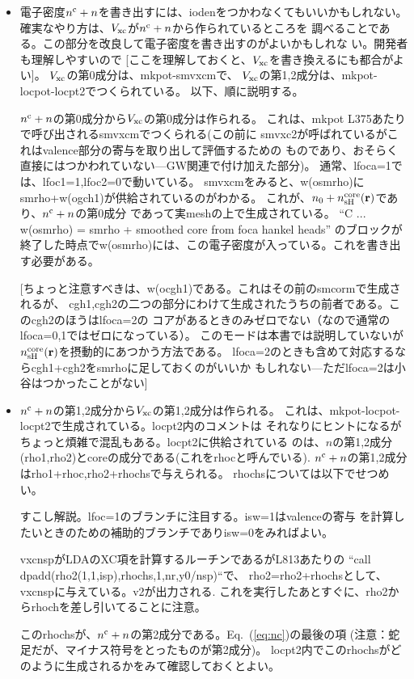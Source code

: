 \documentclass[a4paper,10pt,aip,onecolumn,amsmath,amssymb,floatfix,rmp]{revtex4-1}
\newcommand{\bfr}{{\bf r}}
\newcommand{\req}[1]{\mbox{Eq.~\!(\ref{#1})}}
\begin{document}
\begin{itemize}
\item
電子密度$n^{\rm c}+n$を書き出すには、iodenをつかわなくてもいいかもしれない。
確実なやり方は、$V_{\rm xc}$が$n^{\rm c}+n$から作られているところを
調べることである。この部分を改良して電子密度を書き出すのがよいかもしれな
い。開発者も理解しやすいので
[ここを理解しておくと、$V_{\rm xc}$を書き換えるにも都合がよい]。
$V_{\rm xc}$の第0成分は、mkpot-smvxcmで、
$V_{\rm xc}$の第1,2成分は、mkpot-locpot-locpt2でつくられている。
以下、順に説明する。

$n^{\rm c}+n$の第0成分から$V_{\rm xc}$の第0成分は作られる。
これは、mkpot L375あたりで呼び出されるsmvxcmでつくられる(この前に
smvxc2が呼ばれているがこれはvalence部分の寄与を取り出して評価するための
ものであり、おそらく直接にはつかわれていない---GW関連で付け加えた部分)。
通常、lfoca=1では、lfoc1=1,lfoc2=0で動いている。
smvxcmをみると、w(osmrho)にsmrho+w(ogch1)が供給されているのがわかる。
これが、$n_0+n^{\rm core}_{\rm sH}(\bfr)$であり、$n^{\rm c}+n$の第0成分
であって実meshの上で生成されている。
``C ... w(osmrho) = smrho + smoothed core from foca hankel heads''
のブロックが終了した時点でw(osmrho)には、この電子密度が入っている。これを書き出す必要がある。

{\small [ちょっと注意すべきは、w(ocgh1)である。これはその前のsmcormで生成されるが、
cgh1,cgh2の二つの部分にわけて生成されたうちの前者である。このcgh2のほうはlfoca=2の
コアがあるときのみゼロでない（なので通常のlfoca=0,1ではゼロになっている）。
このモードは本書では説明していないが
$n^{\rm core}_{\rm sH}(\bfr)$を摂動的にあつかう方法である。
lfoca=2のときも含めて対応するならcgh1+cgh2をsmrhoに足しておくのがいいか
もしれない---ただlfoca=2は小谷はつかったことがない]}

\item
$n^{\rm c}+n$の第1,2成分から$V_{\rm xc}$の第1,2成分は作られる。
これは、mkpot-locpot-locpt2で生成されている。locpt2内のコメントは
それなりにヒントになるがちょっと煩雑で混乱もある。locpt2に供給されている
のは、$n$の第1,2成分(rho1,rho2)とcoreの成分である(これをrhocと呼んでいる).
$n^{\rm c}+n$の第1,2成分はrho1+rhoc,rho2+rhochsで与えられる。
rhochsについては以下でせつめい。

すこし解説。lfoc=1のブランチに注目する。isw=1はvalenceの寄与
を計算したいときのための補助的ブランチでありisw=0をみればよい。

vxcnspがLDAのXC項を計算するルーチンであるがL813あたりの
``call dpadd(rho2(1,1,isp),rhochs,1,nr,y0/nsp)``で、
rho2=rho2+rhochsとして、vxcnspに与えている。v2が出力される.
これを実行したあとすぐに、rho2からrhochを差し引いてることに注意。

このrhochsが、$n^{\rm c}+n$の第2成分である。\req{eq:nc}の最後の項
(注意：蛇足だが、マイナス符号をとったものが第2成分)。
locpt2内でこのrhochsがどのように生成されるかをみて確認しておくとよい。

\end{itemize}



\end{document}
